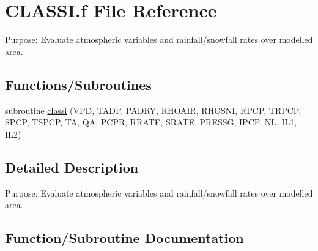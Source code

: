 \hypertarget{CLASSI_8f}{}\section{C\+L\+A\+S\+S\+I.\+f File Reference}
\label{CLASSI_8f}


Purpose\+: Evaluate atmospheric variables and rainfall/snowfall rates over modelled area.  


\subsection*{Functions/\+Subroutines}
\begin{DoxyCompactItemize}
\item 
subroutine \hyperlink{CLASSI_8f_a4e0212f4e58542e09cc303c2a0054949}{classi} (V\+P\+D, T\+A\+D\+P, P\+A\+D\+R\+Y, R\+H\+O\+A\+I\+R, R\+H\+O\+S\+N\+I, R\+P\+C\+P, T\+R\+P\+C\+P, S\+P\+C\+P, T\+S\+P\+C\+P, T\+A, Q\+A, P\+C\+P\+R, R\+R\+A\+T\+E, S\+R\+A\+T\+E, P\+R\+E\+S\+S\+G, I\+P\+C\+P, N\+L, I\+L1, I\+L2)
\end{DoxyCompactItemize}


\subsection{Detailed Description}
Purpose\+: Evaluate atmospheric variables and rainfall/snowfall rates over modelled area. 



\subsection{Function/\+Subroutine Documentation}
\hypertarget{CLASSI_8f_a4e0212f4e58542e09cc303c2a0054949}{}
